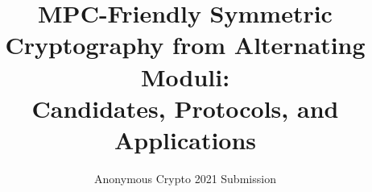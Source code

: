 \documentclass[11pt]{article}
\begin{document}
\title{MPC-Friendly Symmetric Cryptography from Alternating Moduli: \\Candidates,  Protocols, and Applications }
\author{Anonymous Crypto 2021 Submission}
\institute{}
\date{}

\maketitle


\end{document}
